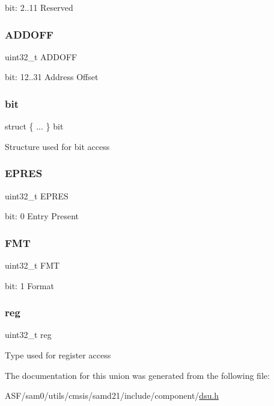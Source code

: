 bit\+: 2..11 Reserved \mbox{\label{union_d_s_u___e_n_t_r_y___type_ad6278bf12a3043ae4eab61592fb5186a}} 
\subsubsection{\texorpdfstring{ADDOFF}{ADDOFF}}
{\footnotesize\ttfamily uint32\+\_\+t A\+D\+D\+O\+FF}

bit\+: 12..31 Address Offset \mbox{\label{union_d_s_u___e_n_t_r_y___type_ae784f489c2276f2801e831128a64bc64}} 
\subsubsection{\texorpdfstring{bit}{bit}}
{\footnotesize\ttfamily struct \{ ... \}   bit}

Structure used for bit access \mbox{\label{union_d_s_u___e_n_t_r_y___type_a0327e9070e0d0a28eaa35ab6c3bc013e}} 
\subsubsection{\texorpdfstring{EPRES}{EPRES}}
{\footnotesize\ttfamily uint32\+\_\+t E\+P\+R\+ES}

bit\+: 0 Entry Present \mbox{\label{union_d_s_u___e_n_t_r_y___type_af0366b5197677d31db7bb05d8049ec01}} 
\subsubsection{\texorpdfstring{FMT}{FMT}}
{\footnotesize\ttfamily uint32\+\_\+t F\+MT}

bit\+: 1 Format \mbox{\label{union_d_s_u___e_n_t_r_y___type_a6b91636401516a477989a336376d7b40}} 
\subsubsection{\texorpdfstring{reg}{reg}}
{\footnotesize\ttfamily uint32\+\_\+t reg}

Type used for register access 

The documentation for this union was generated from the following file\+:\begin{DoxyCompactItemize}
\item 
A\+S\+F/sam0/utils/cmsis/samd21/include/component/\mbox{\hyperlink{component_2dsu_8h}{dsu.\+h}}\end{DoxyCompactItemize}
